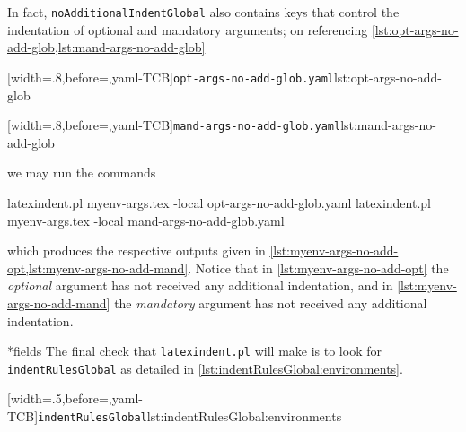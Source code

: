 	In fact, \texttt{noAdditionalIndentGlobal} also contains keys that control the
	indentation of optional and mandatory arguments; on referencing
	\cref{lst:opt-args-no-add-glob,lst:mand-args-no-add-glob}

	\begin{minipage}{.49\textwidth}
		[width=.8\linewidth,before=\centering,yaml-TCB]{\texttt{opt-args-no-add-glob.yaml}}{lst:opt-args-no-add-glob}
	\end{minipage}
	\hfill
	\begin{minipage}{.49\textwidth}
		[width=.8\linewidth,before=\centering,yaml-TCB]{\texttt{mand-args-no-add-glob.yaml}}{lst:mand-args-no-add-glob}
	\end{minipage}

	we may run the commands 
	\begin{commandshell}
latexindent.pl myenv-args.tex -local opt-args-no-add-glob.yaml
latexindent.pl myenv-args.tex -local mand-args-no-add-glob.yaml
\end{commandshell}
	which produces the respective outputs given in
	\cref{lst:myenv-args-no-add-opt,lst:myenv-args-no-add-mand}. Notice that in
	\cref{lst:myenv-args-no-add-opt} the \emph{optional} argument has not received any
	additional indentation, and in \cref{lst:myenv-args-no-add-mand} the \emph{mandatory}
	argument has not received any additional indentation.

	\begin{minipage}{.45\textwidth}
	\end{minipage}
	\hfill
	\begin{minipage}{.45\textwidth}
	\end{minipage}

*{fields}
	The final check that \texttt{latexindent.pl} will make is to look for
	\texttt{indentRulesGlobal} as detailed in \cref{lst:indentRulesGlobal:environments}.

	[width=.5\linewidth,before=\centering,yaml-TCB]{\texttt{indentRulesGlobal}}{lst:indentRulesGlobal:environments}

